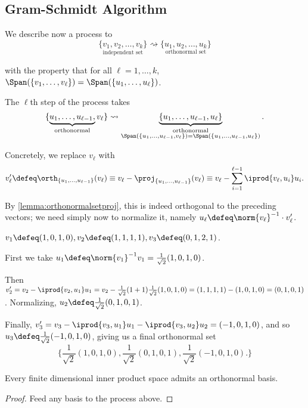 \subsection{Gram-Schmidt Algorithm}
We describe now a process to
\[
\underset{\text{independent set}}{\{v_1, v_2, \dots, v_k\}} \rightsquigarrow \underset{\text{orthonormal set}}{\{u_1, u_2, \dots, u_k\}}
\]

with the property that for all $\ell = 1, \dots, k$, $\Span( \{v_1, \dots, v_\ell\}) = \Span (\{u_1, \dots, u_\ell\})$.

The $\ell$th step of the process takes 
\[
    \{\underbrace{u_1, \dots, u_{\ell-1},}_{\text{orthonormal}} v_\ell\}    \rightsquigarrow \underbrace{\{u_1, \dots, u_{\ell-1}, u_\ell\}}_{\substack{\text{orthonormal}\\ \Span(\{u_1, \dots, u_{\ell-1}, v_\ell\}) = \Span(\{u_1, \dots, u_{\ell-1}, u_\ell\})}}.
\]

Concretely, we replace $v_\ell$ with $$v_\ell' \defeq \orth_{\{u_1, \dots, u_{\ell-1}\}}(v_\ell) \equiv v_\ell - \proj_{\{u_1, \dots, u_{\ell - 1}\}}(v_{\ell}) \equiv v_{\ell} - \sum_{i=1}^{\ell - 1} \iprod{v_\ell, u_i} u_i.$$

By \cref{lemma:orthonormalsetproj}, this is indeed orthogonal to the preceding vectors; we need simply now to normalize it, namely $u_\ell \defeq \norm{v_\ell}^{-1} \cdot v_\ell'$.

\begin{example}
    $v_1 \defeq (1, 0, 1, 0), v_2 \defeq (1, 1, 1, 1), v_3 \defeq (0, 1, 2, 1)$.

    First we take $u_1 \defeq \norm{v_1}^{-1}v_1 = \frac{1}{\sqrt{2}}(1, 0, 1, 0)$.
    
    Then $v_2' = v_2 - \iprod{v_2, u_1} u_1 = v_2 - \frac{1}{\sqrt{2}}(1+1)\frac{1}{\sqrt{2}}(1,0,1,0) = (1,1,1,1) - (1,0,1,0) = (0,1,0,1)$. Normalizing, $u_2 \defeq \frac{1}{\sqrt{2}}(0,1,0,1)$.

    Finally, $v_3' = v_3 - \iprod{v_3, u_1}u_1 - \iprod{v_3, u_2}u_2 = (-1, 0, 1, 0)$, and so $u_3 \defeq \frac{1}{\sqrt{2}}(-1, 0, 1, 0)$, giving us a final orthonormal set \[
    \{
    \frac{1}{\sqrt{2}}(1,0,1,0), \frac{1}{\sqrt{2}}(0,1,0,1), \frac{1}{\sqrt{2}}(-1,0,1,0).
    \}    
    \]
\end{example}

\begin{corollary}
    Every finite dimensional inner product space admits an orthonormal basis.
\end{corollary}

\begin{proof}
    Feed any basis to the process above.
\end{proof}